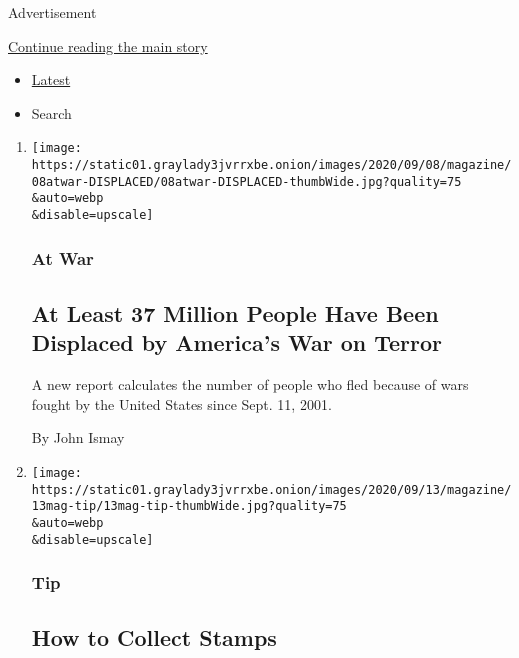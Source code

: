 Advertisement

\protect\hyperlink{after-mid1}{Continue reading the main story}

\begin{itemize}
\tightlist
\item
  \protect\hyperlink{stream-panel}{Latest}
\item
  Search
\end{itemize}

\begin{enumerate}
\def\labelenumi{\arabic{enumi}.}
\item
  \href{/2020/09/08/magazine/displaced-war-on-terror.html}{}

  \texttt{[image: https://static01.graylady3jvrrxbe.onion/images/2020/09/08/magazine/08atwar-DISPLACED/08atwar-DISPLACED-thumbWide.jpg?quality=75\\\&auto=webp\\\&disable=upscale]}

  \hypertarget{at-war}{%
  \subsubsection{At War}\label{at-war}}

  \hypertarget{at-least-37-million-people-have-been-displaced-by-americas-war-on-terror}{%
  \subsection{At Least 37 Million People Have Been Displaced by
  America's War on
  Terror}\label{at-least-37-million-people-have-been-displaced-by-americas-war-on-terror}}

  A new report calculates the number of people who fled because of wars
  fought by the United States since Sept. 11, 2001.

  By John Ismay
\item
  \href{/2020/09/08/magazine/how-to-collect-stamps.html}{}

  \texttt{[image: https://static01.graylady3jvrrxbe.onion/images/2020/09/13/magazine/13mag-tip/13mag-tip-thumbWide.jpg?quality=75\\\&auto=webp\\\&disable=upscale]}

  \hypertarget{tip}{%
  \subsubsection{Tip}\label{tip}}

  \hypertarget{how-to-collect-stamps}{%
  \subsection{How to Collect Stamps}\label{how-to-collect-stamps}}


\end{enumerate}
